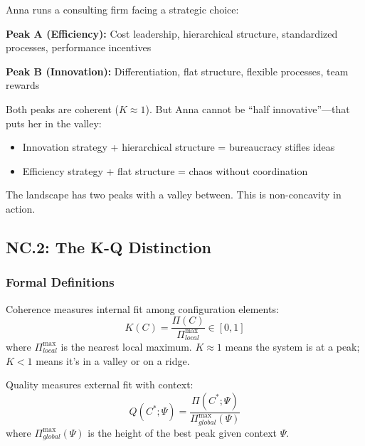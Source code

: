 \begin{tcolorbox}[colback=yellow!5!white, colframe=yellow!75!black,
    title=\textbf{Intuition: Anna's Strategy Dilemma}]

Anna runs a consulting firm facing a strategic choice:

\textbf{Peak A (Efficiency):} Cost leadership, hierarchical structure, standardized processes, performance incentives

\textbf{Peak B (Innovation):} Differentiation, flat structure, flexible processes, team rewards

Both peaks are coherent ($K \approx 1$). But Anna cannot be ``half innovative''---that puts her in the valley:
\begin{itemize}
\item Innovation strategy + hierarchical structure = bureaucracy stifles ideas
\item Efficiency strategy + flat structure = chaos without coordination
\end{itemize}

The landscape has two peaks with a valley between. This is non-concavity in action.
\end{tcolorbox}


\subsection{NC.2: The K-Q Distinction}
\label{sec:nc-kq}

\subsubsection{Formal Definitions}

\begin{definition}[Coherence $K$]
\label{def:nc-coherence}
Coherence measures internal fit among configuration elements:
\begin{equation}
K(C) = \frac{\Pi(C)}{\Pi^{\max}_{local}} \in [0, 1]
\end{equation}
where $\Pi^{\max}_{local}$ is the nearest local maximum. $K \approx 1$ means the system is at a peak; $K < 1$ means it's in a valley or on a ridge.
\end{definition}

\begin{definition}[Quality $Q$]
\label{def:nc-quality}
Quality measures external fit with context:
\begin{equation}
Q(C^*; \Psi) = \frac{\Pi(C^*; \Psi)}{\Pi^{\max}_{global}(\Psi)}
\end{equation}
where $\Pi^{\max}_{global}(\Psi)$ is the height of the best peak given context $\Psi$.
\end{definition}

